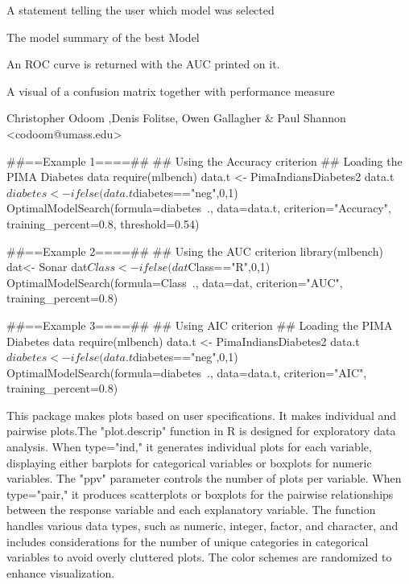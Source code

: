 \documentclass[a4paper]{book}
\begin{document}
%
\begin{Value}
\begin{ldescription}
\item[\code{Status}] A statement telling the user which model was selected
\item[\code{Best Model Output}] The model summary of the best Model
\item[\code{ROC plot}] An ROC curve is returned with the AUC printed on it.
\item[\code{Confusion Matrix}] A visual of a confusion matrix together with performance measure
\end{ldescription}
\end{Value}
%
\begin{Author}
Christopher Odoom ,Denis Folitse, Owen Gallagher \& Paul Shannon <codoom@umass.edu>
\end{Author}
%
\begin{Examples}
\begin{ExampleCode}

##==Example 1====##
## Using the Accuracy criterion
## Loading the PIMA Diabetes data
require(mlbench)
data.t <- PimaIndiansDiabetes2
data.t$diabetes <-ifelse(data.t$diabetes=="neg",0,1)
OptimalModelSearch(formula=diabetes~., data=data.t,
criterion="Accuracy", training_percent=0.8, threshold=0.54)


##==Example 2====##
## Using the AUC criterion
library(mlbench)
dat<- Sonar
dat$Class <- ifelse(dat$Class=="R",0,1)
OptimalModelSearch(formula=Class~., data=dat,
criterion="AUC", training_percent=0.8)


##==Example 3====##
## Using AIC criterion
## Loading the PIMA Diabetes data
require(mlbench)
data.t <- PimaIndiansDiabetes2
data.t$diabetes <-ifelse(data.t$diabetes=="neg",0,1)
OptimalModelSearch(formula=diabetes~., data=data.t,
criterion="AIC", training_percent=0.8)

\end{ExampleCode}
\end{Examples}
%
\begin{Description}
This package makes plots based on user specifications. It makes individual and pairwise plots.The "plot.descrip" function in R is designed for exploratory data analysis. When type="ind," it generates individual plots for each variable, displaying either barplots for categorical variables or boxplots for numeric variables. The "ppv" parameter controls the number of plots per variable. When type="pair," it produces scatterplots or boxplots for the pairwise relationships between the response variable and each explanatory variable. The function handles various data types, such as numeric, integer, factor, and character, and includes considerations for the number of unique categories in categorical variables to avoid overly cluttered plots. The color schemes are randomized to enhance visualization.
\end{Description}
\end{document}
